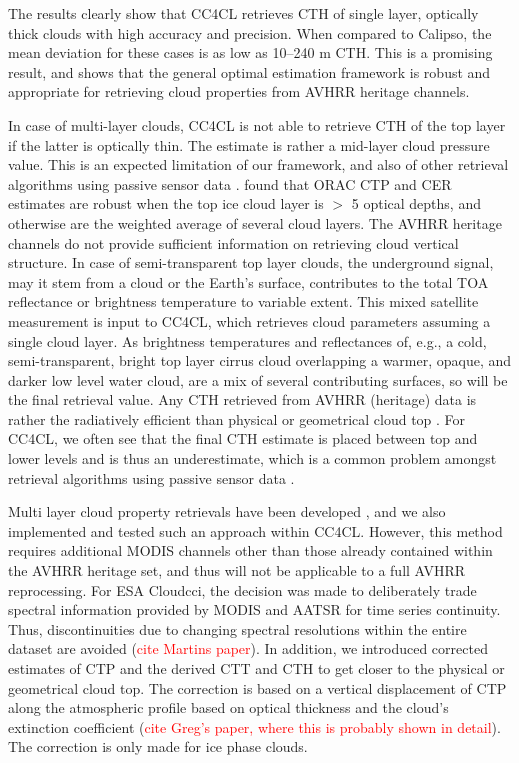 The results clearly show that CC4CL retrieves CTH of single layer, optically thick clouds with high accuracy and precision. When compared to Calipso, the mean deviation for these cases is as low as 10--240 m CTH. This is a promising result, and shows that the general optimal estimation framework is robust and appropriate for retrieving cloud properties from AVHRR heritage channels. 

In case of multi-layer clouds, CC4CL is not able to retrieve CTH of the top layer if the latter is optically thin. The estimate is rather a mid-layer cloud pressure value. This is an expected limitation of our framework, and also of other retrieval algorithms using passive sensor data \citep{Holz08,Karlsson10}. \citet{Poulsen12} found that ORAC CTP and CER estimates are robust when the top ice cloud layer is $>$ 5 optical depths, and otherwise are the weighted average of several cloud layers. The AVHRR heritage channels do not provide sufficient information on retrieving cloud vertical structure. In case of semi-transparent top layer clouds, the underground signal, may it stem from a cloud or the Earth's surface, contributes to the total TOA reflectance or brightness temperature to variable extent. This mixed satellite measurement is input to CC4CL, which retrieves cloud parameters assuming a single cloud layer. As brightness temperatures and reflectances of, e.g., a cold, semi-transparent, bright top layer cirrus cloud overlapping a warmer, opaque, and darker low level water cloud, are a mix of several contributing surfaces, so will be the final retrieval value. Any CTH retrieved from AVHRR (heritage) data is rather the radiatively efficient than physical or geometrical cloud top \citep{Karlsson13}. For CC4CL, we often see that the final CTH estimate is placed between top and lower levels and is thus an underestimate, which is a common problem amongst retrieval algorithms using passive sensor data \citep{Watts11,Holz08,Karlsson13}. 

Multi layer cloud property retrievals have been developed \citep{Watts11}, and we also implemented and tested such an approach within CC4CL. However, this method requires additional MODIS channels other than those already contained within the AVHRR heritage set, and thus will not be applicable to a full AVHRR reprocessing. For ESA Cloud\textunderscore cci, the decision was made to deliberately trade spectral information provided by MODIS and AATSR for time series continuity. Thus, discontinuities due to changing spectral resolutions within the entire dataset are avoided (\textcolor{red}{cite Martins paper}). In addition, we introduced corrected estimates of CTP and the derived CTT and CTH to get closer to the physical or geometrical cloud top. The correction is based on a vertical displacement of CTP along the atmospheric profile based on optical thickness and the cloud's extinction coefficient (\textcolor{red}{cite Greg's paper, where this is probably shown in detail}). The correction is only made for ice phase clouds.

